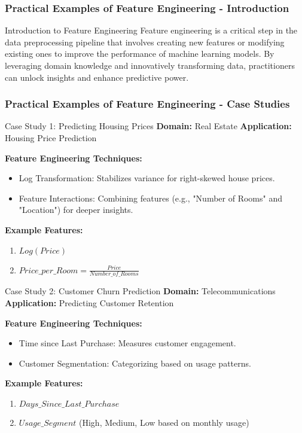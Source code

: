 \documentclass[aspectratio=169]{beamer}
\begin{document}
\begin{frame}[fragile]
    \frametitle{Practical Examples of Feature Engineering - Introduction}
    \begin{block}{Introduction to Feature Engineering}
        Feature engineering is a critical step in the data preprocessing pipeline that involves creating new features or modifying existing ones to improve the performance of machine learning models. By leveraging domain knowledge and innovatively transforming data, practitioners can unlock insights and enhance predictive power.
    \end{block}
\end{frame}

\begin{frame}[fragile]
    \frametitle{Practical Examples of Feature Engineering - Case Studies}
    
    \begin{block}{Case Study 1: Predicting Housing Prices}
        \textbf{Domain:} Real Estate \hfill \textbf{Application:} Housing Price Prediction
        
        \textbf{Feature Engineering Techniques:}
        \begin{itemize}
            \item Log Transformation: Stabilizes variance for right-skewed house prices.
            \item Feature Interactions: Combining features (e.g., "Number of Rooms" and "Location") for deeper insights.
        \end{itemize}

        \textbf{Example Features:}
        \begin{enumerate}
            \item $Log(Price)$
            \item $Price\_per\_Room = \frac{Price}{Number\_of\_Rooms}$
        \end{enumerate}
    \end{block}

    \begin{block}{Case Study 2: Customer Churn Prediction}
        \textbf{Domain:} Telecommunications \hfill \textbf{Application:} Predicting Customer Retention
        
        \textbf{Feature Engineering Techniques:}
        \begin{itemize}
            \item Time since Last Purchase: Measures customer engagement.
            \item Customer Segmentation: Categorizing based on usage patterns.
        \end{itemize}

        \textbf{Example Features:}
        \begin{enumerate}
            \item $Days\_Since\_Last\_Purchase$
            \item $Usage\_Segment$ (High, Medium, Low based on monthly usage)
        \end{enumerate}
    \end{block}
\end{frame}
\end{document}
